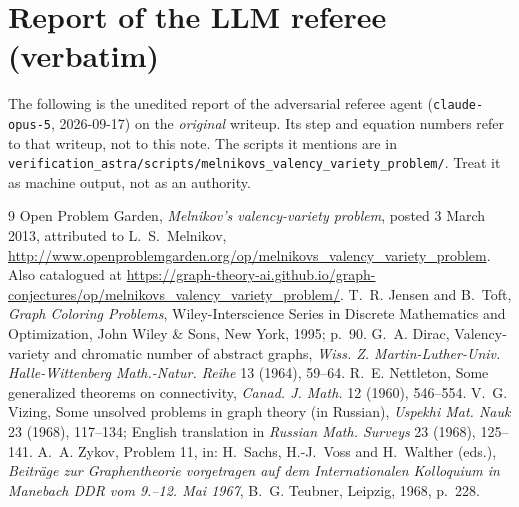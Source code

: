 \documentclass[11pt,a4paper]{article}
\theoremstyle{plain}
\theoremstyle{definition}
\theoremstyle{remark}
\begin{document}
\section{Report of the LLM referee (verbatim)}\label{app:referee}

\begin{tcolorbox}[colback=gray!8,colframe=gray!50,boxrule=0.4pt,arc=2pt]
\small The following is the unedited report of the adversarial referee agent (\texttt{claude-opus-5}, 2026-09-17) on the \emph{original} writeup. Its step and equation numbers refer to that writeup, not to this note. The scripts it mentions are in \texttt{verification\_astra/scripts/melnikovs\_valency\_variety\_problem/}. Treat it as machine output, not as an authority.
\end{tcolorbox}



\begin{thebibliography}{9}
\small
\setlength{\itemsep}{2pt}
 Open Problem Garden, \emph{Melnikov's valency-variety problem}, posted 3 March 2013, attributed to L.~S.~Melnikov, \url{http://www.openproblemgarden.org/op/melnikovs_valency_variety_problem}. Also catalogued at \url{https://graph-theory-ai.github.io/graph-conjectures/op/melnikovs_valency_variety_problem/}.
 T.~R. Jensen and B.~Toft, \emph{Graph Coloring Problems}, Wiley-Interscience Series in Discrete Mathematics and Optimization, John Wiley \& Sons, New York, 1995; p.~90.
 G.~A. Dirac, Valency-variety and chromatic number of abstract graphs, \emph{Wiss. Z. Martin-Luther-Univ. Halle-Wittenberg Math.-Natur. Reihe} 13 (1964), 59--64.
 R.~E. Nettleton, Some generalized theorems on connectivity, \emph{Canad. J. Math.} 12 (1960), 546--554.
 V.~G. Vizing, Some unsolved problems in graph theory (in Russian), \emph{Uspekhi Mat. Nauk} 23 (1968), 117--134; English translation in \emph{Russian Math. Surveys} 23 (1968), 125--141.
 A.~A. Zykov, Problem 11, in: H.~Sachs, H.-J.~Voss and H.~Walther (eds.), \emph{Beiträge zur Graphentheorie vorgetragen auf dem Internationalen Kolloquium in Manebach DDR vom 9.--12. Mai 1967}, B.~G. Teubner, Leipzig, 1968, p.~228.
\end{thebibliography}
\end{document}
